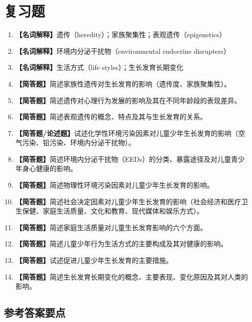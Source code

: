 \section{复习题}

\begin{enumerate}[leftmargin=*, itemsep=8pt]
    \item \textbf{【名词解释】}遗传（heredity）；家族聚集性；表观遗传（epigenetics）
    \item \textbf{【名词解释】}环境内分泌干扰物（environmental endocrine disrupters）
    \item \textbf{【名词解释】}生活方式（life styles）；生长发育长期变化
    \item \textbf{【简答题】}简述家族性遗传对生长发育的影响（遗传度、家族聚集性）。
    \item \textbf{【简答题】}简述遗传对心理行为发展的影响及其在不同年龄段的表现差异。
    \item \textbf{【简答题】}简述表观遗传的概念、特点及其与生长发育的关系。
    \item \textbf{【简答题/论述题】}试述化学性环境污染因素对儿童少年生长发育的影响（空气污染、铅污染、环境内分泌干扰物）。
    \item \textbf{【简答题】}简述环境内分泌干扰物（EEDs）的分类、暴露途径及对儿童青少年身心健康的影响。
    \item \textbf{【简答题】}简述物理性环境污染因素对儿童少年生长发育的影响。
    \item \textbf{【简答题】}简述社会决定因素对儿童少年生长发育的影响（社会经济和医疗卫生保健、家庭生活质量、文化和教育、现代媒体和娱乐方式）。
    \item \textbf{【简答题】}简述家庭生活质量对儿童生长发育影响的六个方面。
    \item \textbf{【简答题】}简述儿童少年行为生活方式的主要构成及其对健康的影响。
    \item \textbf{【简答题】}试述促进儿童少年生长发育的主要措施。
    \item \textbf{【简答题】}简述生长发育长期变化的概念、主要表现、变化原因及其对人类的影响。
\end{enumerate}

\subsection*{参考答案要点}

